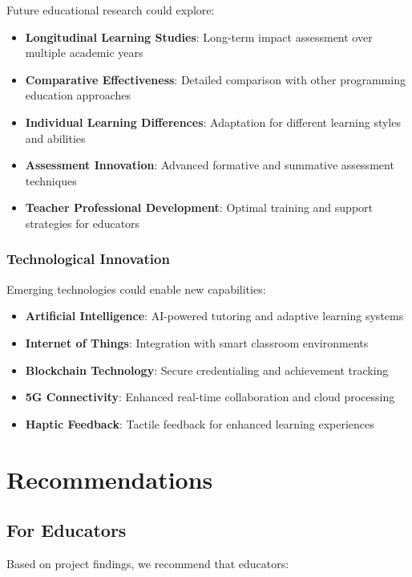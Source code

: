 Future educational research could explore:

\begin{itemize}
    \item \textbf{Longitudinal Learning Studies}: Long-term impact assessment over multiple academic years
    \item \textbf{Comparative Effectiveness}: Detailed comparison with other programming education approaches
    \item \textbf{Individual Learning Differences}: Adaptation for different learning styles and abilities
    \item \textbf{Assessment Innovation}: Advanced formative and summative assessment techniques
    \item \textbf{Teacher Professional Development}: Optimal training and support strategies for educators
\end{itemize}

\subsubsection{Technological Innovation}

Emerging technologies could enable new capabilities:

\begin{itemize}
    \item \textbf{Artificial Intelligence}: AI-powered tutoring and adaptive learning systems
    \item \textbf{Internet of Things}: Integration with smart classroom environments
    \item \textbf{Blockchain Technology}: Secure credentialing and achievement tracking
    \item \textbf{5G Connectivity}: Enhanced real-time collaboration and cloud processing
    \item \textbf{Haptic Feedback}: Tactile feedback for enhanced learning experiences
\end{itemize}

\section{Recommendations}

\subsection{For Educators}

Based on project findings, we recommend that educators:

